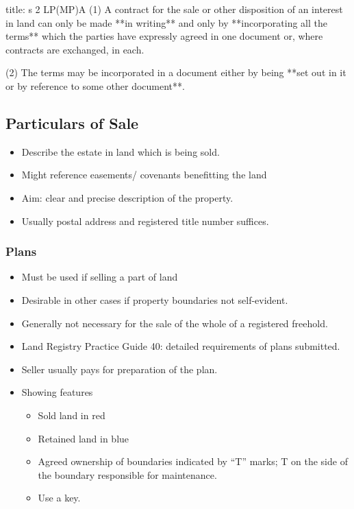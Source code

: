 \documentclass[
]{article}
\newenvironment{Shaded}{}{}
\newcommand{\NormalTok}[1]{#1}
\providecommand{\tightlist}{%
  \setlength{\itemsep}{0pt}\setlength{\parskip}{0pt}}
\begin{document}
\begin{Shaded}
\begin{Highlighting}[]
\NormalTok{title: s 2 LP(MP)A}
\NormalTok{(1) A contract for the sale or other disposition of an interest in land can only be made **in writing** and only by **incorporating all the terms** which the parties have expressly agreed in one document or, where contracts are exchanged, in each.}

\NormalTok{(2) The terms may be incorporated in a document either by being **set out in it or by reference to some other document**.}
\end{Highlighting}
\end{Shaded}

\hypertarget{particulars-of-sale}{%
\subsection{Particulars of Sale}\label{particulars-of-sale}}

\begin{itemize}
\tightlist
\item
  Describe the estate in land which is being sold.
\item
  Might reference easements/ covenants benefitting the land
\item
  Aim: clear and precise description of the property.
\item
  Usually postal address and registered title number suffices.
\end{itemize}

\hypertarget{plans}{%
\subsubsection{Plans}\label{plans}}

\begin{itemize}
\tightlist
\item
  Must be used if selling a part of land
\item
  Desirable in other cases if property boundaries not self-evident.
\item
  Generally not necessary for the sale of the whole of a registered
  freehold.
\item
  Land Registry Practice Guide 40: detailed requirements of plans
  submitted.
\item
  Seller usually pays for preparation of the plan.
\item
  Showing features

  \begin{itemize}
  \tightlist
  \item
    Sold land in red
  \item
    Retained land in blue
  \item
    Agreed ownership of boundaries indicated by ``T'' marks; T on the
    side of the boundary responsible for maintenance.
  \item
    Use a key.
  \end{itemize}
\end{itemize}
\end{document}
